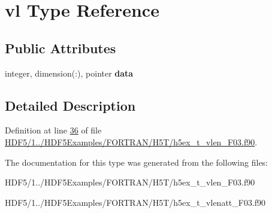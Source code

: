 \hypertarget{structvl}{}\section{vl Type Reference}
\label{structvl}
\subsection*{Public Attributes}
\begin{DoxyCompactItemize}
\item 
\mbox{\label{structvl_a86e1597f7cbdb78c090a2a9d50fb0fad}} 
integer, dimension(\+:), pointer {\bfseries data}
\end{DoxyCompactItemize}


\subsection{Detailed Description}


Definition at line \hyperlink{_h_d_f5_21_810_81_2_h_d_f5_examples_2_f_o_r_t_r_a_n_2_h5_t_2h5ex__t__vlen___f03_8f90_source_l00036}{36} of file \hyperlink{_h_d_f5_21_810_81_2_h_d_f5_examples_2_f_o_r_t_r_a_n_2_h5_t_2h5ex__t__vlen___f03_8f90_source}{H\+D\+F5/1../\+H\+D\+F5\+Examples/\+F\+O\+R\+T\+R\+A\+N/\+H5\+T/h5ex\+\_\+t\+\_\+vlen\+\_\+\+F03.\+f90}.



The documentation for this type was generated from the following files\+:\begin{DoxyCompactItemize}
\item 
H\+D\+F5/1../\+H\+D\+F5\+Examples/\+F\+O\+R\+T\+R\+A\+N/\+H5\+T/h5ex\+\_\+t\+\_\+vlen\+\_\+\+F03.\+f90\item 
H\+D\+F5/1../\+H\+D\+F5\+Examples/\+F\+O\+R\+T\+R\+A\+N/\+H5\+T/h5ex\+\_\+t\+\_\+vlenatt\+\_\+\+F03.\+f90\end{DoxyCompactItemize}
